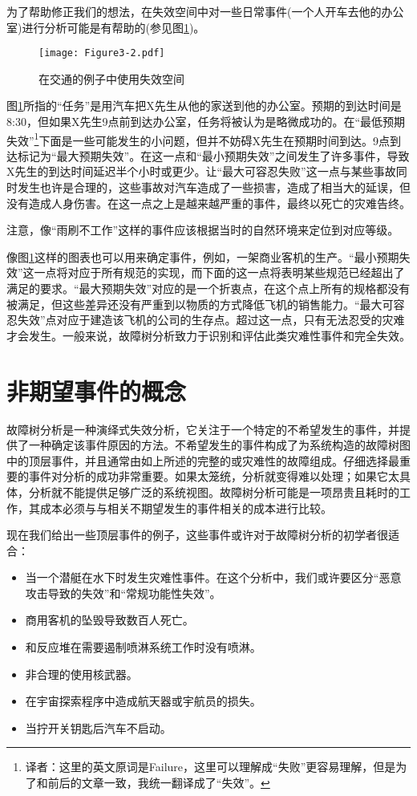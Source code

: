 \documentclass[cn,11pt,chinese]{elegantbook}
\begin{document}
为了帮助修正我们的想法，在失效空间中对一些日常事件(一个人开车去他的办公室)进行分析可能是有帮助的(参见图\ref{fig:fig3_2})。

\begin{figure}[h]
	\centering
	\texttt{[image: Figure3-2.pdf]}
	\caption{在交通的例子中使用失效空间}\label{fig:fig3_2}
\end{figure}

图\ref{fig:fig3_2}所指的“任务”是用汽车把X先生从他的家送到他的办公室。预期的到达时间是8:30，但如果X先生9点前到达办公室，任务将被认为是略微成功的。在“最低预期失效”\footnote{译者：这里的英文原词是Failure，这里可以理解成“失败”更容易理解，但是为了和前后的文章一致，我统一翻译成了“失效”。}下面是一些可能发生的小问题，但并不妨碍X先生在预期时间到达。9点到达标记为“最大预期失效”。在这一点和“最小预期失效”之间发生了许多事件，导致X先生的到达时间延迟半个小时或更少。让“最大可容忍失败”这一点与某些事故同时发生也许是合理的，这些事故对汽车造成了一些损害，造成了相当大的延误，但没有造成人身伤害。在这一点之上是越来越严重的事件，最终以死亡的灾难告终。

注意，像“雨刷不工作”这样的事件应该根据当时的自然环境来定位到对应等级。

像图\ref{fig:fig3_2}这样的图表也可以用来确定事件，例如，一架商业客机的生产。“最小预期失效”这一点将对应于所有规范的实现，而下面的这一点将表明某些规范已经超出了满足的要求。“最大预期失效”对应的是一个折衷点，在这个点上所有的规格都没有被满足，但这些差异还没有严重到以物质的方式降低飞机的销售能力。“最大可容忍失效”点对应于建造该飞机的公司的生存点。超过这一点，只有无法忍受的灾难才会发生。一般来说，故障树分析致力于识别和评估此类灾难性事件和完全失效。


\section{非期望事件的概念}

故障树分析是一种演绎式失效分析，它关注于一个特定的不希望发生的事件，并提供了一种确定该事件原因的方法。不希望发生的事件构成了为系统构造的故障树图中的顶层事件，并且通常由如上所述的完整的或灾难性的故障组成。仔细选择最重要的事件对分析的成功非常重要。如果太笼统，分析就变得难以处理；如果它太具体，分析就不能提供足够广泛的系统视图。故障树分析可能是一项昂贵且耗时的工作，其成本必须与与相关不期望发生的事件相关的成本进行比较。

现在我们给出一些顶层事件的例子，这些事件或许对于故障树分析的初学者很适合：

\begin{itemize}
	\item 当一个潜艇在水下时发生灾难性事件。在这个分析中，我们或许要区分“恶意攻击导致的失效”和“常规功能性失效”。
	\item 商用客机的坠毁导致数百人死亡。
	\item 和反应堆在需要遏制喷淋系统工作时没有喷淋。
	 \item 非合理的使用核武器。
	\item 在宇宙探索程序中造成航天器或宇航员的损失。
	\item 当拧开关钥匙后汽车不启动。
\end{itemize}
\end{document}
